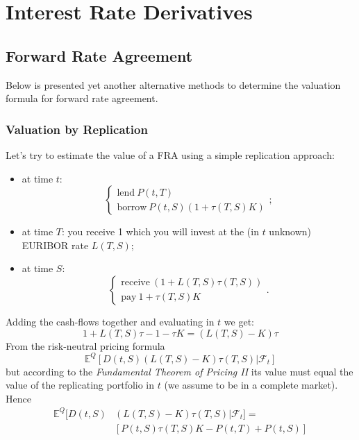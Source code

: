 \documentclass[12pt,a4paper]{book}
\newcommand{\myendproof}{\ensuremath{\hfill\square}}
\begin{document}
\chapter{Interest Rate Derivatives}
\section{Forward Rate Agreement}
Below is presented yet another alternative methods to determine the valuation formula for forward rate agreement.

\subsection{Valuation by Replication}
Let's try to estimate the value of a FRA using a simple replication approach:
\begin{itemize}
\item at time $t$: 
	\begin{equation*}
	\begin{cases}
		\text{lend}~P(t,T)\\
		\text{borrow}~P(t,S)(1+\tau(T,S)K)
	\end{cases};
	\end{equation*}
\item at time $T$: you receive 1 which you will invest at the (in $t$ unknown) EURIBOR rate $L(T,S)$;
\item at time $S$: 
	\begin{equation*}
		\begin{cases}
			\text{receive}~(1+L(T,S)\tau(T,S))\\
			\text{pay}~1 + \tau(T,S)K
		\end{cases}.
	\end{equation*}
\end{itemize}

Adding the cash-flows together and evaluating in $t$ we get:
\begin{equation*}
	1+L(T,S)\tau - 1 - \tau K = (L(T,S)-K)\tau
\end{equation*}
From the risk-neutral pricing formula
	\begin{equation*}
		\mathbb{E}^Q[D(t, S)(L(T, S)-K)\tau(T,S)|\mathcal{F}_t]
	\end{equation*}
but according to the \emph{Fundamental Theorem of Pricing II} its value must equal the value of the replicating portfolio in $t$ (we assume to be in a complete market). Hence
\begin{equation}
	\begin{aligned}
		\mathbb{E}^Q[D(t,S)&(L(T,S)-K)\tau(T,S)|\mathcal{F}_t]=\\
			&[P(t,S)\tau(T,S)K-P(t,T)+P(t,S)]
			\label{eq:fra_as_expectation}
	\end{aligned}
\end{equation}
\end{document}
